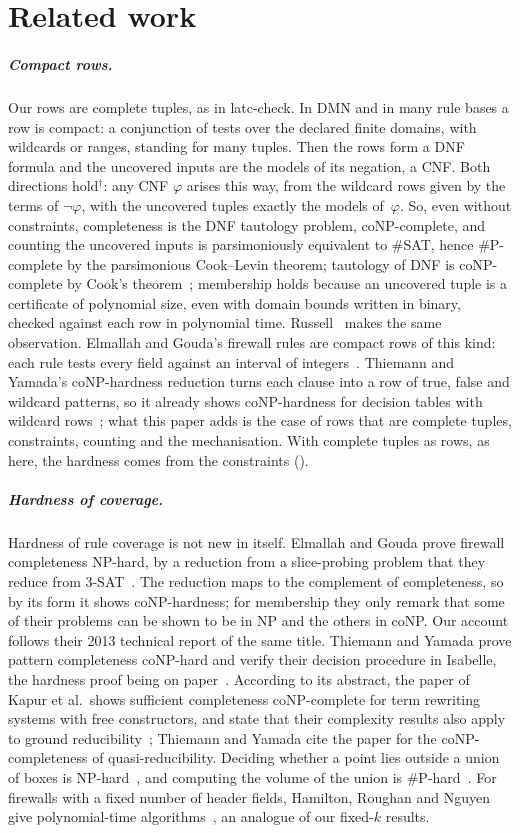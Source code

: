 \documentclass[pdflatex,sn-mathphys-num]{sn-jnl}
\theoremstyle{thmstyleone}
\theoremstyle{thmstylethree}
\newcommand{\informal}{\ensuremath{^{\dagger}}}
\begin{document}
\section{Related work}
\label{sec:related}

\subparagraph*{Compact rows.}
Our rows are complete tuples, as in latc-check. In DMN and in many rule bases a row is compact: a
conjunction of tests over the declared finite domains, with wildcards or ranges, standing for
many tuples. Then the rows form a DNF formula and the uncovered inputs are the models of its
negation, a CNF. Both directions hold\informal: any CNF $\varphi$ arises this way, from the
wildcard rows given by the terms of $\neg\varphi$, with the uncovered tuples exactly the models
of~$\varphi$. So, even without constraints, completeness is the DNF tautology problem,
coNP-complete, and counting the uncovered inputs is parsimoniously equivalent to \#SAT, hence
\#P-complete by the parsimonious Cook--Levin theorem; tautology of DNF is coNP-complete by Cook's
theorem~\cite{Cook1971}; membership holds because an uncovered tuple is a certificate of
polynomial size, even with domain bounds written in binary, checked against each row in
polynomial time. Russell~\cite{PaperA} makes the same observation. Elmallah and Gouda's firewall rules are compact rows of this kind: each rule tests every field
against an interval of integers~\cite{ElmallahGouda2017}.
Thiemann and Yamada's coNP-hardness reduction turns each clause into a row of true, false and
wildcard patterns, so it already shows coNP-hardness for decision tables with wildcard
rows~\cite{ThiemannYamada2026}; what this paper adds is the case of rows that are complete
tuples, constraints, counting and the mechanisation. With complete tuples as rows, as here, the
hardness comes from the constraints ().

\subparagraph*{Hardness of coverage.}
Hardness of rule coverage is not new in itself. Elmallah and Gouda prove firewall completeness NP-hard, by a reduction from a
slice-probing problem that they reduce from 3-SAT~\cite{ElmallahGouda2017}. The reduction maps
to the complement of completeness, so by its form it shows coNP-hardness; for membership they
only remark that some of their problems can be shown to be in NP and the others in coNP. Our account follows their 2013 technical report of the same title.
Thiemann
and Yamada prove pattern completeness coNP-hard and verify their decision procedure in
Isabelle, the hardness proof being on paper~\cite{ThiemannYamada2026}. According to its abstract, the paper of Kapur et al.\ shows sufficient completeness coNP-complete for term rewriting systems with
free constructors, and state that their complexity results also apply to ground
reducibility~\cite{KapurNRZ1991}; Thiemann and Yamada cite the paper for the coNP-completeness of
quasi-reducibility.
Deciding whether a point lies outside a union of boxes is NP-hard~\cite{Chan2010}, and computing
the volume of the union is \#P-hard~\cite{BringmannFriedrich2010}. For firewalls with a fixed
number of header fields, Hamilton, Roughan and Nguyen give polynomial-time
algorithms~\cite{HamiltonRoughanNguyen2022}, an analogue of our fixed-$k$ results.
\end{document}
